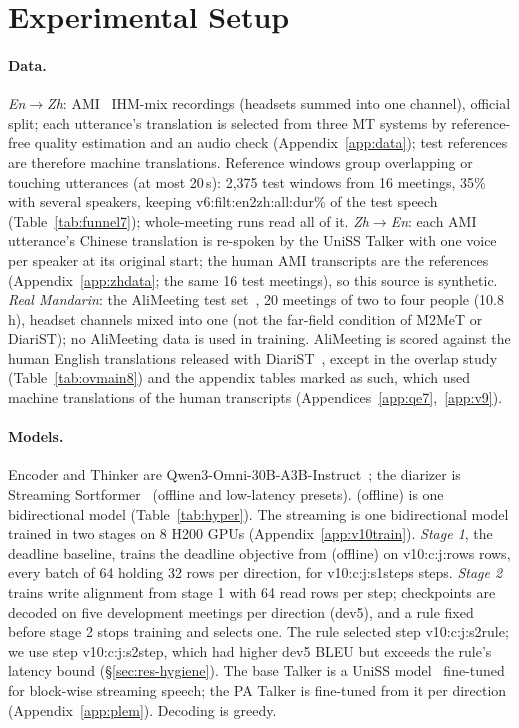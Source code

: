 \section{Experimental Setup}
\label{sec:setup}

\paragraph{Data.} \emph{En$\rightarrow$Zh}: AMI~\citep{carletta2005ami} IHM-mix recordings (headsets summed into one
channel), official split; each utterance's translation is selected from three MT systems by reference-free quality
estimation and an audio check (Appendix~\ref{app:data}); test references are therefore machine translations. Reference
windows group overlapping or touching utterances (at most 20\,s): 2{,}375 test windows from 16 meetings, 35\% with
several speakers, keeping \num{v6:filt:en2zh:all:dur}\% of the test speech (Table~\ref{tab:funnel7}); whole-meeting runs
read all of it. \emph{Zh$\rightarrow$En}: each AMI utterance's Chinese translation is re-spoken by the UniSS Talker with
one voice per speaker at its original start; the human AMI transcripts are the references (Appendix~\ref{app:zhdata};
the same 16 test meetings), so this source is synthetic. \emph{Real Mandarin}: the AliMeeting test set~\citep{yu2022m2met}, 20
meetings of two to four people (10.8\,h), headset channels mixed into one (not the far-field condition of M2MeT or
DiariST); no AliMeeting data is used in training. AliMeeting is scored
against the human English translations released with DiariST~\citep{yang2024diarist}, except in the overlap study
(Table~\ref{tab:ovmain8}) and the appendix tables marked as such, which used machine translations of the human
transcripts (Appendices~\ref{app:qe7},~\ref{app:v9}).

\paragraph{Models.} Encoder and Thinker are Qwen3-Omni-30B-A3B-Instruct~\citep{xu2025qwen3omni}; the diarizer is
Streaming Sortformer~\citep{medennikov2025streaming} (offline and low-latency presets). \sys{} (offline) is one
bidirectional model (Table~\ref{tab:hyper}). The streaming \sys{} is one bidirectional model trained in two stages on 8
H200 GPUs (Appendix~\ref{app:v10train}). \emph{Stage 1}, the deadline baseline, trains the deadline objective from
\sys{} (offline) on \num{v10:c:j:rows} rows, every batch of 64 holding 32 rows per direction, for \num{v10:c:j:s1steps}
steps. \emph{Stage 2} trains write alignment from stage 1 with 64 read rows per step; checkpoints are decoded on five
development meetings per direction (dev5), and a rule fixed before stage 2 stops training and selects one. The rule
selected step \num{v10:c:j:s2rule}; we use step \num{v10:c:j:s2step}, which had higher dev5 BLEU but exceeds the rule's
latency bound (\S\ref{sec:res-hygiene}). The base Talker is a UniSS model~\citep{uniss2025} fine-tuned for block-wise
streaming speech; the PA Talker is fine-tuned from it per direction (Appendix~\ref{app:plem}). Decoding is greedy.

